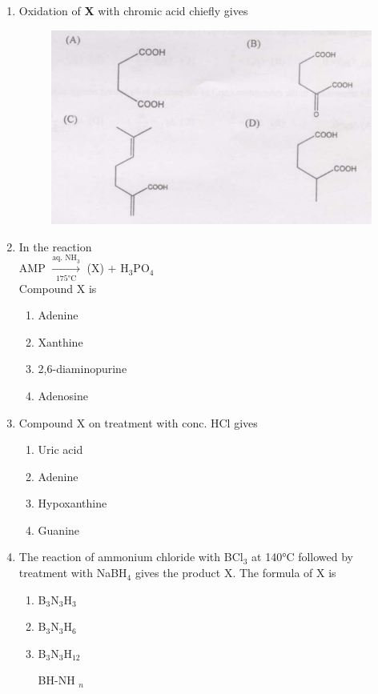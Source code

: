 \documentclass[journal,12pt,onecolumn]{IEEEtran}
\theoremstyle{remark}
\begin{document}
\begin{enumerate}
  

\item  Oxidation of \textbf{X} with chromic acid chiefly gives 
 \hfill{}
 \begin{figure}
     \centering
     \includegraphics[width=0.5\columnwidth]{figs/image15.png} 
     \caption{}
     \label{fig:figure15}
 \end{figure}
 
   

 \item  In the reaction\\
\hspace*{1cm} AMP \hspace{0.5cm} $\xrightarrow[\text{175°C}]{\text{aq. NH}_3}$ \hspace{0.5cm} (X) + H$_3$PO$_4$\\
Compound X is \hfill{}
\begin{multicols}{2}
\begin{enumerate} 
    \item Adenine
    \item Xanthine
    \item 2,6-diaminopurine
    \item Adenosine
\end{enumerate}
\end{multicols}
  
\item  Compound X on treatment with conc. HCl gives \hfill{}
\begin{multicols}{2}
\begin{enumerate} 
    \item Uric acid
    \item Adenine
    \item Hypoxanthine
    \item Guanine
\end{enumerate}
\end{multicols}
  

\item  The reaction of ammonium chloride with BCl$_3$ at 140°C followed by treatment with NaBH$_4$ gives the product X. The formula of X is \hfill{}
\begin{multicols}{2}
\begin{enumerate} 
    \item B$_3$N$_3$H$_3$
    \item B$_3$N$_3$H$_6$
    \item B$_3$N$_3$H$_{12}$
     \item   [BH-NH]$_n$
\end{enumerate}
\end{multicols}



\end{enumerate}
\end{document}

